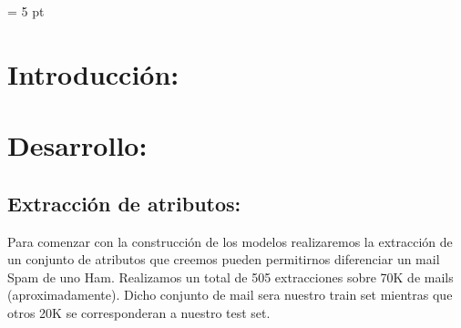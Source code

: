 \documentclass[a4paper]{article}
\begin{document}
\parskip = 5 pt
\thispagestyle{empty}

\maketitle




\newpage
\tableofcontents
\thispagestyle{empty}

\newpage
\section{Introducción:}





\newpage

\section{Desarrollo:}

\subsection{Extracción de atributos:}

Para comenzar con la construcción de los modelos realizaremos la extracción de un conjunto de atributos que creemos pueden permitirnos diferenciar un mail Spam de uno Ham. Realizamos un total de 505 extracciones sobre 70K de mails (aproximadamente). Dicho conjunto de mail sera nuestro train set mientras que otros 20K se corresponderan a nuestro test set.
\end{document}
